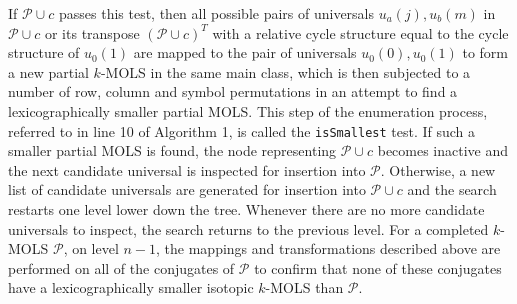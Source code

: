 \documentclass[11pt, a4paper]{article}
\newcommand{\p}{\mathcal{P}}
\newcounter{ls}
\begin{document}
If  $\p \cup c$ passes this test, then  all possible pairs of universals  $u_a{(j)}, u_{b}{(m)}$ in $ \p \cup c$ or its transpose  $(\p \cup c)^T$  with a relative cycle structure equal to the cycle structure of $u_0{(1)}$ are mapped to the pair of universals $u_0{(0)}, u_{0}{(1)}$ to form a new partial $k$-MOLS in the same main class, which is then subjected to a number of row, column and symbol permutations  in an attempt to find a lexicographically smaller partial MOLS. This step of the enumeration process, referred to in line 10 of   Algorithm 1, is called the \texttt{isSmallest} test.
If such a smaller partial MOLS is found, the node representing $\p \cup c$ becomes inactive and the next candidate universal is inspected for insertion into $\p$. Otherwise, a new list of candidate universals are generated for insertion into $\p \cup c$ and the search restarts one level lower down  the tree. Whenever there are no more candidate universals to inspect, the search returns to the previous level.  
For a completed $k$-MOLS $\p$, on  level $n-1$, the mappings and transformations described above are performed on all of the conjugates of $\p$ to confirm that none of these conjugates have a lexicographically smaller isotopic $k$-MOLS than $\p$. 
\end{document}
